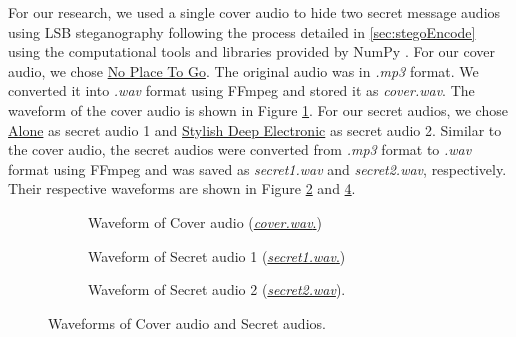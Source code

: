 \documentclass[a4paper]{cas-sc}
\begin{document}
For our research, we used a single cover audio to hide two secret message audios using LSB steganography following the process detailed in \ref{sec:stegoEncode} using the computational tools and libraries provided by NumPy \cite{harris2020array}. For our cover audio, we chose \href{https://pixabay.com/music/beats-no-place-to-go-216744/}{No Place To Go}. The original audio was in \textit{.mp3} format. We converted it into \textit{.wav} format using FFmpeg \cite{newmarch2017ffmpeg} and stored it as \textit{cover.wav}. The waveform of the cover audio is shown in Figure \ref{fig:coverAudio}. For our secret audios, we chose \href{https://pixabay.com/music/future-bass-alone-296348/}{Alone} as secret audio 1 and \href{https://pixabay.com/music/future-bass-stylish-deep-electronic-262632/}{Stylish Deep Electronic} as secret audio 2. Similar to the cover audio, the secret audios were converted from \textit{.mp3} format to \textit{.wav} format using FFmpeg and was saved as \textit{secret1.wav} and \textit{secret2.wav}, respectively. Their respective waveforms are shown in Figure \ref{fig:secretAudio1} and \ref{fig:secretAudio2}.

\begin{figure}[pos=H]
    \begin{center}
        \begin{subfigure}[!h]{0.45\textwidth}
            
            \caption{Waveform of Cover audio (\href{https://pixabay.com/music/beats-no-place-to-go-216744/}{\textit{cover.wav}.})}
            \label{fig:coverAudio}
        \end{subfigure}
    \end{center}
    \begin{subfigure}[!h]{0.45\textwidth}
        \begin{center}
            \centering
            
            \caption{Waveform of Secret audio 1 (\href{https://pixabay.com/music/future-bass-alone-296348/}{\textit{secret1.wav}.})}
            \label{fig:secretAudio1}
        \end{center}
    \end{subfigure}
    \hfill
    \begin{subfigure}[!h]{0.45\textwidth}
        \begin{center}
            
            \caption{Waveform of Secret audio 2 (\href{https://pixabay.com/music/future-bass-stylish-deep-electronic-262632/}{\textit{secret2.wav}}).}
            \label{fig:secretAudio2}
        \end{center}
    \end{subfigure}
    \caption{Waveforms of Cover audio and Secret audios.}
\end{figure}
\end{document}
